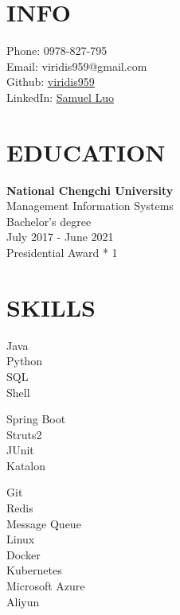 \documentclass[]{resume}
\begin{document}
%
%

%
%

\begin{minipage}[t]{0.31\textwidth} 


\section{INFO}
Phone: 0978-827-795 \\
Email: viridis959@gmail.com \\
Github: \href{https://github.com/viridis959}{\underline{viridis959}} \\
LinkedIn: \href{https://www.linkedin.com/in/samuelluo1}{\underline{Samuel Luo}}
\sectionsep


\section{EDUCATION} 
{\bf National Chengchi University} \\
Management Information Systems \\
Bachelor's degree \\
July 2017 - June 2021 \\
Presidential Award * 1
\sectionsep


\section{SKILLS}
Java \\ Python \\ SQL \\ Shell
\sectionsep

Spring Boot \\ Struts2 \\ JUnit \\ Katalon
\sectionsep

Git \\ Redis \\ Message Queue \\
Linux \\ Docker \\ Kubernetes \\ 
Microsoft Azure \\ Aliyun

%
%

\end{minipage} 
\end{document}
